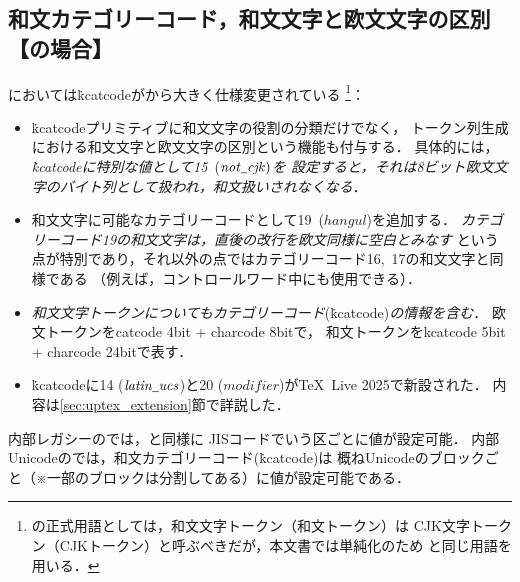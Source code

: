 \documentclass[a4paper,11pt,nomag,dvipdfmx]{jsarticle}
\def\_{\leavevmode\vrule width .45em height -.2ex depth .3ex\relax}
\begin{document}
\subsection{和文カテゴリーコード，和文文字と欧文文字の区別【\upTeX の場合】}
\label{sec:uptex_kcat}
\upTeX においては\.{kcatcode}が\pTeX から大きく仕様変更されている
\footnote{\upTeX の正式用語としては，和文文字トークン（和文トークン）は
CJK文字トークン（CJKトークン）と呼ぶべきだが，本文書では単純化のため
\pTeX と同じ用語を用いる．}：
\begin{itemize}
  \item \.{kcatcode}プリミティブに和文文字の役割の分類だけでなく，
    トークン列生成における和文文字と欧文文字の区別という機能も付与する．
    具体的には，\emph{\.{kcatcode}に特別な値として15~}($\mathit{not\_cjk})$\emph{を
    設定すると，それは8ビット欧文文字のバイト列として扱われ，和文扱いされなくなる}．
  \item 和文文字に可能なカテゴリーコードとして19~($\mathit{hangul}$)を追加する．
    \emph{カテゴリーコード19の和文文字は，直後の改行を欧文同様に空白とみなす}
    という点が特別であり，それ以外の点ではカテゴリーコード16,~17の和文文字と同様である
    （例えば，コントロールワード中にも使用できる）．
  \item \emph{和文文字トークンについてもカテゴリーコード}(\.{kcatcode})\emph{の情報を含む}．
    欧文トークンをcatcode 4bit + charcode 8bitで，
    和文トークンをkcatcode 5bit + charcode 24bitで表す．
  \item \.{kcatcode}に14 ($\mathit{latin\_ucs}$)と20 ($\mathit{modifier}$)が\TeX~Live 2025で新設された．
    内容は\ref{sec:uptex_extension}節で詳説した．
\end{itemize}

\begin{cslist}
  \csitem[\.{kcatcode} <character code>=<14--20>]
  内部レガシーの\upTeX では，\pTeX と同様に
  JISコードでいう区ごとに値が設定可能．
  内部Unicodeの\upTeX では，和文カテゴリーコード(\.{kcatcode})は
  概ねUnicodeのブロックごと（※一部のブロックは分割してある）に値が設定可能である．
\end{cslist}
\end{document}
